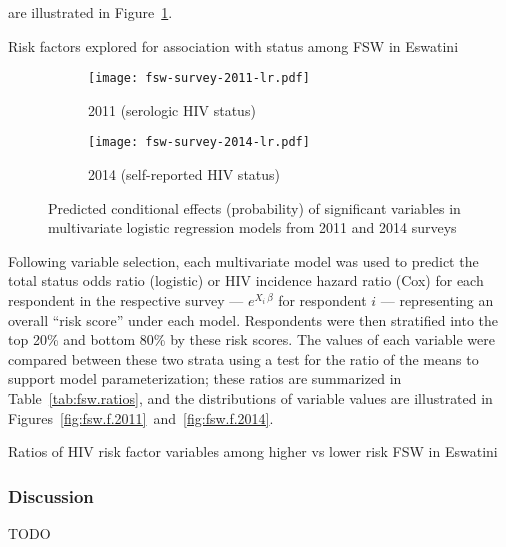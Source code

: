 are illustrated in Figure~\ref{fig:fsw.lr}.
\begin{table}
  \centering
  \caption{Risk factors explored for association with \hivp status among FSW in Eswatini}
  \label{tab:fsw.stats}
  
\end{table}
\begin{figure}
  \begin{subfigure}{0.4\linewidth}
    \centering
    \texttt{[image: fsw-survey-2011-lr.pdf]}
    \caption{2011 (serologic HIV status)}
  \end{subfigure}%
  \begin{subfigure}{0.6\linewidth}
    \centering
    \texttt{[image: fsw-survey-2014-lr.pdf]}
    \caption{2014 (self-reported HIV status)}
  \end{subfigure}
  \caption{Predicted conditional effects (probability)
    of significant variables in multivariate logistic regression models
    from 2011 and 2014 surveys}
  \label{fig:fsw.lr}
\end{figure}
\par
Following variable selection, each multivariate model was used to predict
the total \hivp status odds ratio (logistic) or HIV incidence hazard ratio (Cox)
for each respondent in the respective survey ---
\ie $e^{X_i\,\beta}$ for respondent $i$ ---
representing an overall ``risk score'' under each model.
Respondents were then stratified into the top 20\% and bottom 80\% by these risk scores.
The values of each variable were compared between these two strata
using a test for the ratio of the means \cite{Tamhane2004}
to support model parameterization;
these ratios are summarized in Table~\ref{tab:fsw.ratios},
and the distributions of variable values are illustrated in
Figures~\ref{fig:fsw.f.2011}~and~\ref{fig:fsw.f.2014}.
\begin{table}
  \centering
  \caption{Ratios of HIV risk factor variables among higher vs lower risk FSW in Eswatini}
  \label{tab:fsw.ratios}
  
\end{table}
\subsubsection{Discussion}\label{model.par.fsw.disc}
TODO

